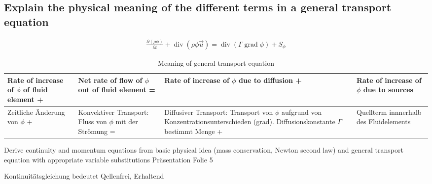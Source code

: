 \documentclass[a4paper]{scrartcl}
\begin{document}
\subsection{Explain the physical meaning of the different terms in a general
transport equation}

\begin{align}
\frac{\partial(\rho \phi)}{\partial t} + \operatorname{div}(\rho\phi\vec
u)=\operatorname{div}(\Gamma \operatorname{grad} \phi) + S_\phi
\end{align}

\begin{table}[h]
\begin{center}
\begin{tabular}{|p{3cm}|p{3cm}|p{3cm}|p{3cm}|}
\hline Rate of increase of $\phi$ of fluid element +& Net rate of flow of $\phi$
out of fluid element =& Rate of increase of $\phi$ due to diffusion +& Rate of
increase of $\phi$ due to sources \\
\hline Zeitliche Änderung von $\phi$  +& Konvektiver Transport: Fluss von $\phi$
mit der Strömung =& Diffusiver Transport: Transport von $\phi$ aufgrund von
Konzentrationsunterschieden (grad). Diffusionskonstante $\Gamma$ bestimmt Menge
+& Quellterm innnerhalb des Fluidelements \\
\hline
\end{tabular}
\caption{Meaning of general transport equation}
\end{center}
\end{table}

Derive continuity and momentum equations from basic physical idea (mass conservation, Newton second law) and general transport equation with appropriate variable substitutions
Präsentation Folie 5

Kontinuitätsgleichung bedeutet Qellenfrei, Erhaltend
\end{document}
